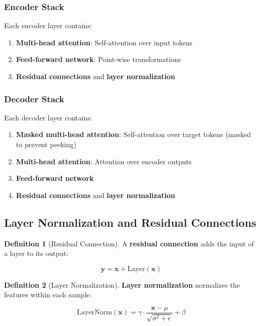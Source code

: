 \documentclass[11pt,a4paper]{article}
\theoremstyle{definition}
\newtheorem{definition}{Definition}[section]
\theoremstyle{plain}
\theoremstyle{remark}
\begin{document}
\subsubsection{Encoder Stack}

Each encoder layer contains:
\begin{enumerate}
    \item \textbf{Multi-head attention}: Self-attention over input tokens
    \item \textbf{Feed-forward network}: Point-wise transformations
    \item \textbf{Residual connections} and \textbf{layer normalization}
\end{enumerate}

\subsubsection{Decoder Stack}

Each decoder layer contains:
\begin{enumerate}
    \item \textbf{Masked multi-head attention}: Self-attention over target tokens (masked to prevent peeking)
    \item \textbf{Multi-head attention}: Attention over encoder outputs
    \item \textbf{Feed-forward network}
    \item \textbf{Residual connections} and \textbf{layer normalization}
\end{enumerate}

\subsection{Layer Normalization and Residual Connections}

\begin{definition}[Residual Connection]
A \textbf{residual connection} adds the input of a layer to its output:

\[
\mathbf{y} = \mathbf{x} + \text{Layer}(\mathbf{x})
\]
\end{definition}

\begin{definition}[Layer Normalization]
\textbf{Layer normalization} normalizes the features within each sample:

\[
\text{LayerNorm}(\mathbf{x}) = \gamma \cdot \frac{\mathbf{x} - \mu}{\sqrt{\sigma^2 + \epsilon}} + \beta
\]
\end{definition}
\end{document}
